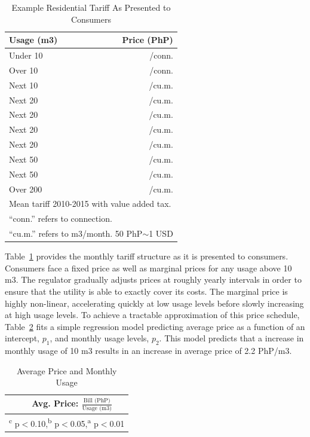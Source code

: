 \documentclass[12pt]{article}
\begin{document}
\begin{table}[H]
\centering
\caption{Example Residential Tariff As Presented to Consumers}\label{table:tarifftrue}
\vspace{-2mm}
\begin{tabular}{l*{1}{r}}
\toprule
Usage (m3) & Price (PhP) \\
\midrule
Under   10    &   /conn. \\
Over    10    &   /conn. \\
Next    10    &   /cu.m. \\
Next    20    &   /cu.m. \\
Next    20    &   /cu.m. \\
Next    20    &   /cu.m. \\
Next    20    &   /cu.m. \\
Next    50    &   /cu.m. \\
Next    50    &   /cu.m. \\
Over   200    &   /cu.m. \\
\bottomrule
\multicolumn{2}{l}{\scriptsize Mean tariff 2010-2015 with value added tax. }\\[-.5em]
\multicolumn{2}{l}{\scriptsize ``conn.'' refers to connection. }\\[-.5em]
\multicolumn{2}{l}{\scriptsize ``cu.m.'' refers to m3/month.  50 PhP$\sim$1 USD }
\end{tabular}
\end{table}

Table~\ref{table:tarifftrue} provides the monthly tariff structure as it is presented to consumers.  Consumers face a fixed price as well as marginal prices for any usage above 10 m3.  The regulator gradually adjusts prices at roughly yearly intervals in order to ensure that the utility is able to exactly cover its costs.  The marginal price is highly non-linear, accelerating quickly at low usage levels before slowly increasing at high usage levels.  To achieve a tractable approximation of this price schedule, Table~\ref{table:tcd_predict} fits a simple regression model predicting average price as a function of an intercept, $p_1$, and monthly usage levels, $p_2$.  This model predicts that a increase in monthly usage of 10 m3 results in an increase in average price of 2.2 PhP/m3.  

\begin{table}[H]
\small
\centering
\caption{Average Price and Monthly Usage}\label{table:tcd_predict}
\vspace{-2mm}
\begin{tabular}{lc}
\toprule
& \small Avg. Price: $\frac{\text{Bill (PhP)}}{\text{Usage (m3)}}$    \\
\midrule 

\bottomrule
\multicolumn{2}{l}{\scriptsize \textsuperscript{c} p$<$0.10,\textsuperscript{b} p$<$0.05,\textsuperscript{a} p$<$0.01 }
\end{tabular}
\end{table}
\end{document}
